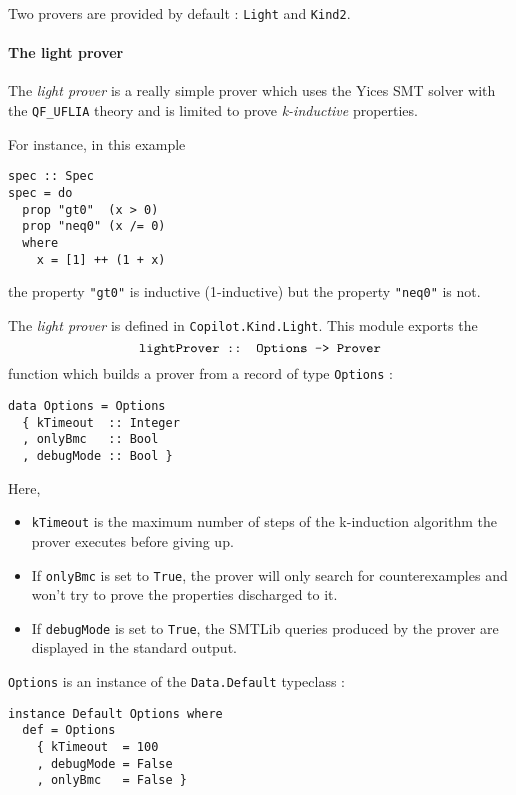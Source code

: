 Two provers are provided by default : \texttt{Light} and \texttt{Kind2}.

\paragraph{The light prover}\label{the-light-prover}

The \emph{light prover} is a really simple prover which uses the Yices
SMT solver with the \texttt{QF\_UFLIA} theory and is limited to prove
\emph{k-inductive} properties.

For instance, in this example

\begin{lstlisting}[frame=single]
spec :: Spec
spec = do
  prop "gt0"  (x > 0)
  prop "neq0" (x /= 0)
  where
    x = [1] ++ (1 + x)
\end{lstlisting}

the property \texttt{"gt0"} is inductive (1-inductive) but the property
\texttt{"neq0"} is not.

The \emph{light prover} is defined in \texttt{Copilot.Kind.Light}. This
module exports the 
$$\texttt{lightProver :: Options -\textgreater{} Prover}$$ function which
builds a prover from a record of type \texttt{Options} :

\begin{lstlisting}[frame=single]
data Options = Options 
  { kTimeout  :: Integer
  , onlyBmc   :: Bool
  , debugMode :: Bool } 
\end{lstlisting}
Here,

\begin{itemize}
\itemsep1pt\parskip0pt
\item
  \texttt{kTimeout} is the maximum number of steps of the k-induction
  algorithm the prover executes before giving up.
\item
  If \texttt{onlyBmc} is set to \texttt{True}, the prover will only
  search for counterexamples and won't try to prove the properties
  discharged to it.
\item
  If \texttt{debugMode} is set to \texttt{True}, the SMTLib queries
  produced by the prover are displayed in the standard output.
\end{itemize}

\texttt{Options} is an instance of the \texttt{Data.Default} typeclass :

\begin{lstlisting}[frame=single]
instance Default Options where
  def = Options 
    { kTimeout  = 100
    , debugMode = False 
    , onlyBmc   = False }

\end{lstlisting}

